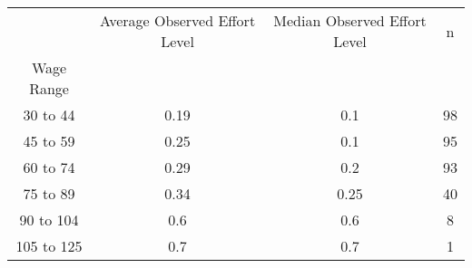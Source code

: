 \begin{tabular}{cccc}
\toprule
{} & Average Observed Effort Level & Median Observed Effort Level &   n \\
Wage Range &                               &                              &     \\
\midrule
30 to 44   &                          0.19 &                          0.1 &  98 \\
45 to 59   &                          0.25 &                          0.1 &  95 \\
60 to 74   &                          0.29 &                          0.2 &  93 \\
75 to 89   &                          0.34 &                         0.25 &  40 \\
90 to 104  &                           0.6 &                          0.6 &   8 \\
105 to 125 &                           0.7 &                          0.7 &   1 \\
\bottomrule
\end{tabular}

